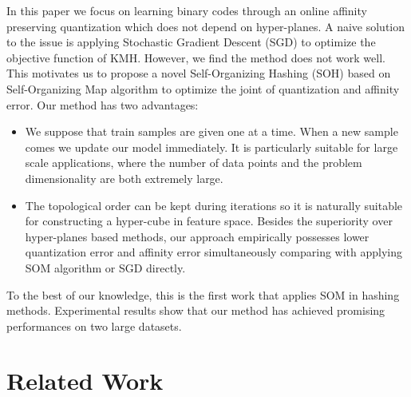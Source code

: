 \documentclass{article}
\begin{document}
In this paper we focus on learning binary codes through an online affinity preserving quantization which does not depend on hyper-planes. A naive solution to the issue is  applying Stochastic Gradient Descent (SGD) to optimize the objective function of KMH. However, we find the method does not work well. This motivates us to propose a novel  Self-Organizing Hashing (SOH) based on Self-Organizing Map \cite{kohonen1998self} algorithm to optimize the joint of quantization and affinity error. Our method has two advantages:
\begin{itemize}
	\item We suppose that train samples are given one at a time. When a new sample comes we update our model immediately. It is particularly suitable
	for large scale applications, where the number of data points and the problem dimensionality are both extremely large.
	\item The topological order can be kept during iterations so it is naturally suitable for constructing a hyper-cube in feature space. Besides the superiority over hyper-planes based methods, our approach empirically possesses lower quantization error and affinity error simultaneously comparing with applying SOM algorithm or SGD directly.
\end{itemize}

To the best of our knowledge, this is  the first work that applies SOM in hashing methods. Experimental results show that our method has achieved promising performances on two large datasets.

\section{Related Work}
\end{document}
